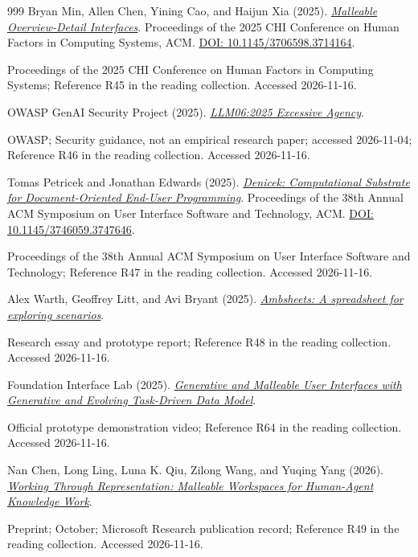 \documentclass[11pt,letterpaper]{article}
\begin{document}
\begin{thebibliography}{999}
Bryan Min, Allen Chen, Yining Cao, and Haijun Xia (2025).
\href{https://hci.ucsd.edu/papers/malleable-odi.pdf}{\emph{Malleable Overview-Detail Interfaces}}.
Proceedings of the 2025 CHI Conference on Human Factors in Computing Systems, ACM.
\href{https://doi.org/10.1145/3706598.3714164}{DOI: 10.1145/3706598.3714164}.
\par {\small Proceedings of the 2025 CHI Conference on Human Factors in Computing Systems; Reference R45 in the reading collection.}
{\small Accessed 2026-11-16.}

OWASP GenAI Security Project (2025).
\href{https://genai.owasp.org/llmrisk/llm062025-excessive-agency/}{\emph{LLM06:2025 Excessive Agency}}.
\par {\small OWASP; Security guidance, not an empirical research paper; accessed 2026-11-04; Reference R46 in the reading collection.}
{\small Accessed 2026-11-16.}

Tomas Petricek and Jonathan Edwards (2025).
\href{https://tomasp.net/academic/papers/denicek/}{\emph{Denicek: Computational Substrate for Document-Oriented End-User Programming}}.
Proceedings of the 38th Annual ACM Symposium on User Interface Software and Technology, ACM.
\href{https://doi.org/10.1145/3746059.3747646}{DOI: 10.1145/3746059.3747646}.
\par {\small Proceedings of the 38th Annual ACM Symposium on User Interface Software and Technology; Reference R47 in the reading collection.}
{\small Accessed 2026-11-16.}

Alex Warth, Geoffrey Litt, and Avi Bryant (2025).
\href{https://www.inkandswitch.com/project/ambsheets/live25/}{\emph{Ambsheets: A spreadsheet for exploring scenarios}}.
\par {\small Research essay and prototype report; Reference R48 in the reading collection.}
{\small Accessed 2026-11-16.}

Foundation Interface Lab (2025).
\href{https://www.youtube.com/watch?v=X3cf1U1dFGQ}{\emph{Generative and Malleable User Interfaces with Generative and Evolving Task-Driven Data Model}}.
\par {\small Official prototype demonstration video; Reference R64 in the reading collection.}
{\small Accessed 2026-11-16.}

Nan Chen, Long Ling, Luna K. Qiu, Zilong Wang, and Yuqing Yang (2026).
\href{https://www.microsoft.com/en-us/research/publication/working-through-representation-malleable-workspaces-for-human-agent-knowledge-work/}{\emph{Working Through Representation: Malleable Workspaces for Human-Agent Knowledge Work}}.
\par {\small Preprint; October; Microsoft Research publication record; Reference R49 in the reading collection.}
{\small Accessed 2026-11-16.}


\end{thebibliography}
\end{document}
